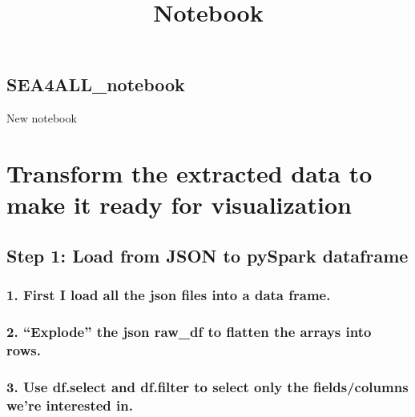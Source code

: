 \documentclass[11pt]{article}
\title{Notebook}
\begin{document}
    
    \maketitle
    
    

    
    \hypertarget{sea4all_notebook}{%
\subsection{SEA4ALL\_notebook}\label{sea4all_notebook}}

New notebook

    \hypertarget{transform-the-extracted-data-to-make-it-ready-for-visualization}{%
\section{\texorpdfstring{\textbf{Transform the extracted data to make it
ready for
visualization}}{Transform the extracted data to make it ready for visualization}}\label{transform-the-extracted-data-to-make-it-ready-for-visualization}}

    \hypertarget{step-1-load-from-json-to-pyspark-dataframe}{%
\subsection{Step 1: Load from JSON to pySpark
dataframe}\label{step-1-load-from-json-to-pyspark-dataframe}}

\hypertarget{first-i-load-all-the-json-files-into-a-data-frame.}{%
\subsubsection{1. First I load all the json files into a data
frame.}\label{first-i-load-all-the-json-files-into-a-data-frame.}}

\hypertarget{explode-the-json-raw_df-to-flatten-the-arrays-into-rows.}{%
\subsubsection{2. ``Explode'' the json raw\_df to flatten the arrays
into
rows.}\label{explode-the-json-raw_df-to-flatten-the-arrays-into-rows.}}

\hypertarget{use-df.select-and-df.filter-to-select-only-the-fieldscolumns-were-interested-in.}{%
\subsubsection{3. Use df.select and df.filter to select only the
fields/columns we're interested
in.}\label{use-df.select-and-df.filter-to-select-only-the-fieldscolumns-were-interested-in.}}
\end{document}
